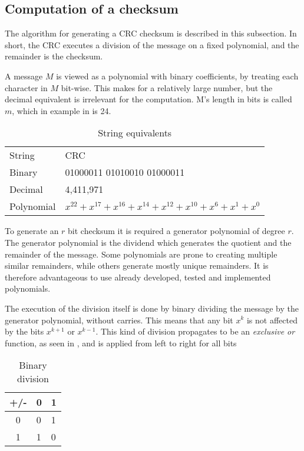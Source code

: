 \subsection{Computation of a checksum}
The algorithm for generating a CRC checksum is described in this subsection.
In short, the CRC executes a division of the message on a fixed polynomial, and the remainder is the checksum. 

A message $M$ is viewed as a polynomial with binary coefficients, by treating each character in $M$ bit-wise. This makes for a relatively large number, but the decimal equivalent is irrelevant for the computation. M's length in bits is called $m$, which in example in  is 24.

\begin{table}[h!]
	\centering
	\begin{tabular}{ll}
		String  & CRC                        \\
		Binary  & 01000011 01010010 01000011 \\
		Decimal & 4,411,971                  \\
		Polynomial & $x^{22} + x^{17} + x^{16} + x^{14} + x^{12} + x^{10} + x^{6} + x^{1} + x^{0}$
	\end{tabular}
	\caption{String equivalents}
	\label{tab:string}
\end{table}

To generate an $r$ bit checksum it is required a generator polynomial of degree $r$. The generator polynomial is the dividend which generates the quotient and the remainder of the message. Some polynomials are prone to creating multiple similar remainders, while others generate mostly unique remainders. It is therefore advantageous to use already developed, tested and implemented polynomials.

The execution of the division itself is done by binary dividing the message by the generator polynomial, without carries. This means that any bit $x^k$ is not affected by the bits $x^{k+1}$ or $x^{k-1}$. This kind of division propagates to be an \textit{exclusive or} function, as seen in , and is applied from left to right for all bits 

\begin{table}[h!]
	\centering
	\begin{tabular}{c|ll}
		+/- & 0 & 1 \\
		\hline
		0   & 0 & 1 \\
		1   & 1 & 0
	\end{tabular}
	\caption{Binary division}
	\label{tab:binarydivision}
\end{table}




